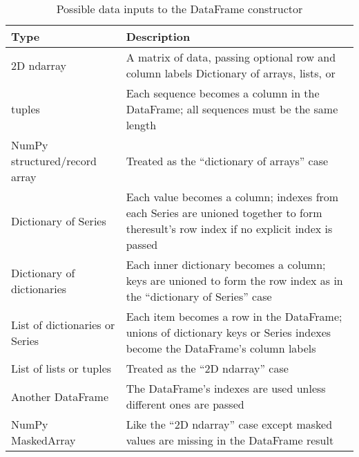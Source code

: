 \begin{table}
    \caption{Possible data inputs to the DataFrame constructor}
    \label{Possible data inputs to the DataFrame constructor}
    \begin{tabularx}{\textwidth}{lX}
        \hline
        Type                           & Description                                                                                                                             \\
        \hline
        2D ndarray                     & A matrix of data, passing optional row and column labels Dictionary of arrays, lists, or                                                \\
        tuples                         & Each sequence becomes a column in the DataFrame; all sequences must be the same length                                                  \\
        NumPy structured/record array  & Treated as the “dictionary of arrays” case                                                                                              \\
        Dictionary of Series           & Each value becomes a column; indexes from each Series are unioned together to form theresult's row index if no explicit index is passed \\
        Dictionary of dictionaries     & Each inner dictionary becomes a column; keys are unioned to form the row index as in the “dictionary of Series” case                    \\
        List of dictionaries or Series & Each item becomes a row in the DataFrame; unions of dictionary keys or Series indexes become the DataFrame's column labels              \\
        List of lists or tuples        & Treated as the “2D ndarray” case                                                                                                        \\
        Another DataFrame              & The DataFrame's indexes are used unless different ones are passed                                                                       \\
        NumPy MaskedArray              & Like the “2D ndarray” case except masked values are missing in the DataFrame result                                                     \\
        \hline
    \end{tabularx}
\end{table}

